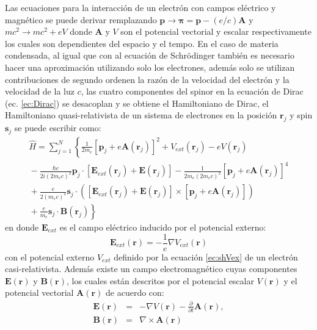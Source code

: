 \documentclass[12pt,a4paper, oneside]{book}
\begin{document}
    Las ecuaciones para la interacci\'on de un electr\'on con campos el\'ectrico y magn\'etico se puede derivar remplazando $\pmb{p} \rightarrow \pmb{\pi} = \pmb{p}-(e/c) \pmb{A}$ y $m c^2 \rightarrow mc^2 + e V$ donde $\pmb{A}$ y $V$ son el potencial vectorial y escalar respectivamente los cuales son dependientes del espacio y el tempo. En el caso de materia condensada, al igual que con al ecuaci\'on de Schr\"odinger tambi\'en es necesario hacer una aproximaci\'on utilizando solo los electrones, adem\'as solo se utilizan contribuciones de segundo ordenen la raz\'on de la velocidad del electr\'on y la velocidad de la luz $c$, las cuatro componentes del spinor en la ecuaci\'on de Dirac (ec. \ref{ec:Dirac}) se desacoplan y se obtiene el Hamiltoniano  de Dirac, el Hamiltoniano quasi-relativista de un sistema de electrones en la posici\'on $\pmb{r}_j$ y spin $\pmb{s}_j$ se puede escribir como:
    \begin{multline}
    \hat{H} = \sum_{j=1}^{N} \left\{\frac{1}{2 m_e} [\pmb{p}_j + e \pmb{A} (\pmb{r}_j)]^2 + V_{ext} (\pmb{r}_j)- e V (\pmb{r}_j)\right.\\ \left. {} -\frac{\hbar e}{2 i  (2 m_e c)^2} \pmb{p}_j \cdot [\pmb{E}_{ext} (\pmb{r}_j) + \pmb{E} (\pmb{r}_j)] - \frac{1}{2 m_e (2 m_e c)^2} [\pmb{p}_j + e \pmb{A} (\pmb{r}_j)]^4 \right. \\
    \left. {} + \frac{e}{2 (m_e c)^2} \pmb{s}_j \cdot ([\pmb{E}_{ext} (\pmb{r}_j) + \pmb{E} (\pmb{r}_j)] \times [\pmb{p}_j + e \pmb{A} (\pmb{r}_j)]  ) \right. \\
    \left. {} + \frac{e}{m_e} \pmb{s}_j \cdot \pmb{B} (\pmb{r}_j) \right\} \label{ec:HamilDirac}
    \end{multline}    
    en donde $\pmb{E}_{ext}$ es el campo el\'ectrico inducido por el potencial externo:
    \begin{equation}
    \pmb{E}_{ext} (\pmb{r}) = - \frac{1}{e} \nabla V_{ext} (\pmb{r}) \label{ec:Eext}
    \end{equation}
    con el potencial externo $V_{ext}$ definido por la ecuaci\'on \ref{ec:shVex} de un electr\'on casi-relativista. Adem\'as existe un campo electromagn\'etico cuyas componentes $\pmb{E} (\pmb{r})$ y $\pmb{B} (\pmb{r})$, los cuales est\'an descritos por el potencial escalar $V(\pmb{r})$ y el potencial vectorial $\pmb{A} (\pmb{r})$ de acuerdo con:
    \begin{eqnarray}
    \pmb{E} (\pmb{r}) &=& - \nabla V(\pmb{r}) - \frac{\partial}{\partial t} \pmb{A} (\pmb{r}), \nonumber \\
    \pmb{B} (\pmb{r}) &=& \nabla \times \pmb{A} (\pmb{r}) \label{ec:camposElectromageticos}
    \end{eqnarray}
\end{document}
